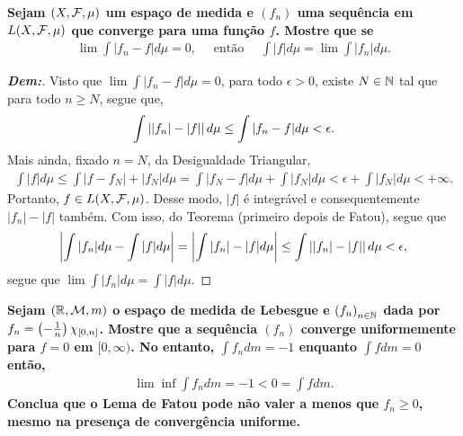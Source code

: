 \textbf{Sejam $(X, \mathcal F, \mu)$ um espaço de medida e $(f_n)$ uma sequência em 
$L(X, \mathcal F, \mu)$ que converge para uma função $f$. Mostre que se 
\begin{align*}
  \lim \int |f_n - f| d\mu = 0, \quad\text{ então }\quad \int |f| d\mu = \lim \int |f_n|d\mu.
\end{align*}}
\begin{proof}[\textbf{Dem:}] Visto que $\lim \int |f_n - f| d\mu = 0$, 
  para todo $\epsilon>0$, existe $N \in \mathbb N$ tal que para todo $n \ge N$,
  segue que, 
  \begin{align*}
    \int \left||f_n| - |f|\right| d\mu\le \int |f_n - f| d\mu < \epsilon.
  \end{align*}
  Mais ainda, fixado $n = N$, da Desigualdade Triangular,
  \begin{align*}
    \int |f| d\mu \le \int |f - f_N| + |f_N| d\mu = \int |f_N - f| d\mu + \int |f_N| d\mu
    < \epsilon + \int |f_N| d\mu < +\infty.
  \end{align*}
  Portanto, $f \in L(X, \mathcal F, \mu)$. Desse modo, $|f|$ é integrável e consequentemente
  $|f_n| - |f|$ também. Com isso, do Teorema (primeiro depois de Fatou), segue que
  \begin{align*}
    \left|\int |f_n| d\mu - \int |f| d\mu\right| = 
    \left|\int |f_n| - |f| d\mu\right| \le \int \left||f_n| - |f|\right| d\mu < \epsilon, 
  \end{align*}
  segue que $\lim \int |f_n| d\mu = \int |f| d\mu$.
\end{proof}

\textbf{
  Sejam $(\mathbb R, \mathcal M, m)$ o espaço de medida de Lebesgue e $\left(f_n\right)_{n \in \mathbb N}$ dada por 
  $f_n = \left(-\frac{1}{n}\right) \chi_{[0, n]}$. Mostre que a sequência 
  $(f_n)$ converge uniformemente para $f = 0$ em $[0, \infty)$. No entanto, 
  $\int f_n dm = -1$ enquanto $\int f dm =0$ então, 
  \begin{align*}
    \lim \inf \int f_n dm = -1 < 0 = \int f dm.
  \end{align*}
  Conclua que o Lema de Fatou pode não valer a menos que $f_n \ge 0$, mesmo na presença 
  de convergência uniforme.
}

